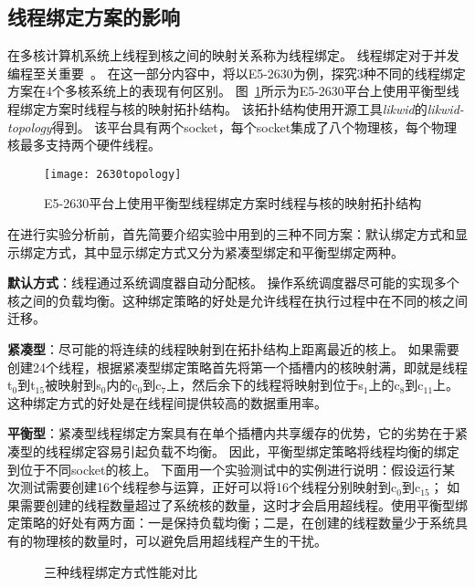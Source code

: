\subsection{线程绑定方案的影响}
\label{sec:thread_pinning}
在多核计算机系统上线程到核之间的映射关系称为线程绑定。
线程绑定对于并发编程至关重要~\cite{pinning}。
在这一部分内容中，将以E5-2630为例，探究3种不同的线程绑定方案在4个多核系统上的表现有何区别。
图~\ref{fig:2630topology}所示为E5-2630平台上使用平衡型线程绑定方案时线程与核的映射拓扑结构。
该拓扑结构使用开源工具\textit{likwid}\cite{likwid}的\textit{likwid-topology}得到。
该平台具有两个socket，每个socket集成了八个物理核，每个物理核最多支持两个硬件线程。

\begin{figure}[htbp]
\centering
\texttt{[image: 2630topology]}
\caption{E5-2630平台上使用平衡型线程绑定方案时线程与核的映射拓扑结构}
\label{fig:2630topology}
\end{figure}

在进行实验分析前，首先简要介绍实验中用到的三种不同方案：默认绑定方式和显示绑定方式，其中显示绑定方式又分为紧凑型绑定和平衡型绑定两种。

\textbf{默认方式}：线程通过系统调度器自动分配核。
操作系统调度器尽可能的实现多个核之间的负载均衡。这种绑定策略的好处是允许线程在执行过程中在不同的核之间迁移。

\textbf{紧凑型}：尽可能的将连续的线程映射到在拓扑结构上距离最近的核上。
如果需要创建24个线程，根据紧凑型绑定策略首先将第一个插槽内的核映射满，即就是线程t$_0$到t$_{15}$被映射到s$_0$内的c$_0$到c$_7$上，然后余下的线程将映射到位于s$_1$上的c$_8$到c$_{11}$上。
这种绑定方式的好处是在线程间提供较高的数据重用率。

\textbf{平衡型}：紧凑型线程绑定方案具有在单个插槽内共享缓存的优势，它的劣势在于紧凑型的线程绑定容易引起负载不均衡。
因此，平衡型绑定策略将线程均衡的绑定到位于不同socket的核上。
下面用一个实验测试中的实例进行说明：假设运行某次测试需要创建16个线程参与运算，正好可以将16个线程分别映射到c$_0$到c$_{15}$；
如果需要创建的线程数量超过了系统核的数量，这时才会启用超线程。使用平衡型绑定策略的好处有两方面：一是保持负载均衡；二是，在创建的线程数量少于系统具有的物理核的数量时，可以避免启用超线程产生的干扰。


\begin{figure}[htbp]
\centering
\caption{三种线程绑定方式性能对比}
\label{fig:pin}
\end{figure}

